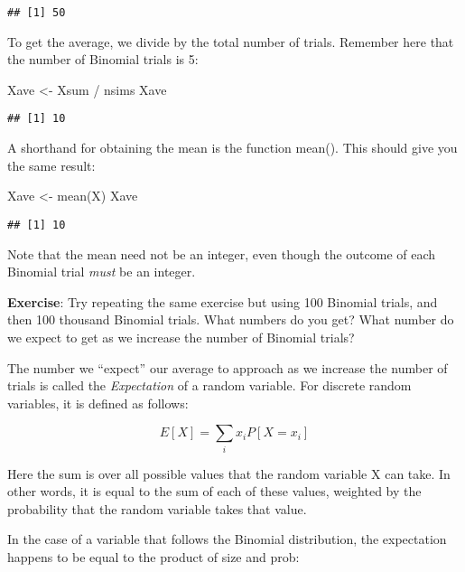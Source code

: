 \documentclass[
]{book}
\newenvironment{Shaded}{\begin{snugshade}}{\end{snugshade}}
\newcommand{\FunctionTok}[1]{\textcolor[rgb]{0.00,0.00,0.00}{#1}}
\newcommand{\NormalTok}[1]{#1}
\newcommand{\OtherTok}[1]{\textcolor[rgb]{0.56,0.35,0.01}{#1}}
\newcommand{\SpecialCharTok}[1]{\textcolor[rgb]{0.00,0.00,0.00}{#1}}
\begin{document}
\begin{verbatim}
## [1] 50
\end{verbatim}

To get the average, we divide by the total number of trials. Remember here that the number of Binomial trials is 5:

\begin{Shaded}
\begin{Highlighting}[]
\NormalTok{Xave }\OtherTok{\textless{}{-}}\NormalTok{ Xsum }\SpecialCharTok{/}\NormalTok{ nsims}
\NormalTok{Xave}
\end{Highlighting}
\end{Shaded}

\begin{verbatim}
## [1] 10
\end{verbatim}

A shorthand for obtaining the mean is the function mean(). This should give you the same result:

\begin{Shaded}
\begin{Highlighting}[]
\NormalTok{Xave }\OtherTok{\textless{}{-}} \FunctionTok{mean}\NormalTok{(X)}
\NormalTok{Xave}
\end{Highlighting}
\end{Shaded}

\begin{verbatim}
## [1] 10
\end{verbatim}

Note that the mean need not be an integer, even though the outcome of each Binomial trial \emph{must} be an integer.

\textbf{Exercise}: Try repeating the same exercise but using 100 Binomial trials, and then 100 thousand Binomial trials. What numbers do you get? What number do we expect to get as we increase the number of Binomial trials?

The number we ``expect'' our average to approach as we increase the number of trials is called the \emph{Expectation} of a random variable. For discrete random variables, it is defined as follows:

\[E[X] = \sum_{i}x_iP[X=x_i]\]

Here the sum is over all possible values that the random variable X can take. In other words, it is equal to the sum of each of these values, weighted by the probability that the random variable takes that value.

In the case of a variable that follows the Binomial distribution, the expectation happens to be equal to the product of size and prob:
\end{document}
